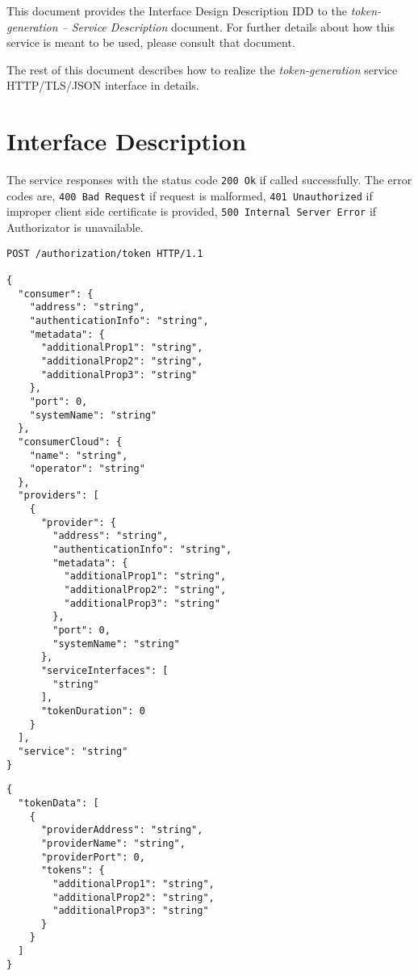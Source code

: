 \documentclass[a4paper]{arrowhead}
\newcommand{\fref}[1]{{\textcolor{ArrowheadBlue}{\hyperref[sec:functions:#1]{#1}}}}
\begin{document}
This document provides the Interface Design Description IDD to the \textit{token-generation -- Service Description} document.
For further details about how this service is meant to be used, please consult that document.

The rest of this document describes how to realize the \textit{token-generation} service HTTP/TLS/JSON interface in details.

\newpage

\section{Interface Description}
\label{sec:functions}

The service responses with the status code \texttt{200 Ok} if called successfully. The error codes are, \texttt{400 Bad Request} if request is malformed, \texttt{401 Unauthorized} if improper client side certificate is provided, \texttt{500 Internal Server Error} if Authorizator is unavailable.

\begin{lstlisting}[language=http,label={lst:authorization},caption={An \fref{token-generation} invocation.}]
POST /authorization/token HTTP/1.1

{
  "consumer": {
    "address": "string",
    "authenticationInfo": "string",
    "metadata": {
      "additionalProp1": "string",
      "additionalProp2": "string",
      "additionalProp3": "string"
    },
    "port": 0,
    "systemName": "string"
  },
  "consumerCloud": {
    "name": "string",
    "operator": "string"
  },
  "providers": [
    {
      "provider": {
        "address": "string",
        "authenticationInfo": "string",
        "metadata": {
          "additionalProp1": "string",
          "additionalProp2": "string",
          "additionalProp3": "string"
        },
        "port": 0,
        "systemName": "string"
      },
      "serviceInterfaces": [
        "string"
      ],
      "tokenDuration": 0
    }
  ],
  "service": "string"
}

\end{lstlisting}

\clearpage

\begin{lstlisting}[language=http,label={lst:authorization},caption={An \fref{token-generation} response.}]
{
  "tokenData": [
    {
      "providerAddress": "string",
      "providerName": "string",
      "providerPort": 0,
      "tokens": {
        "additionalProp1": "string",
        "additionalProp2": "string",
        "additionalProp3": "string"
      }
    }
  ]
}
\end{lstlisting}
\end{document}
